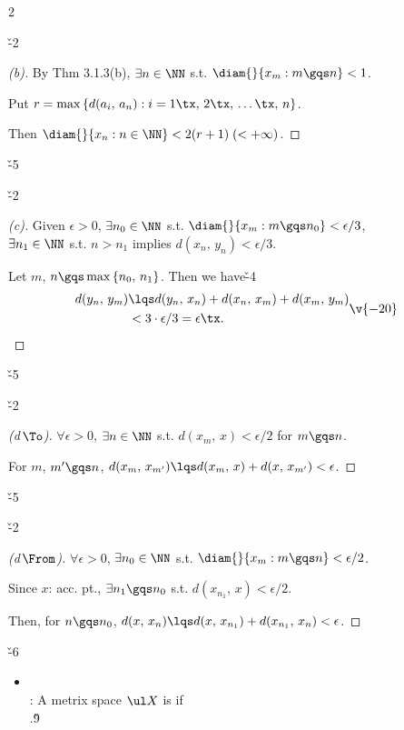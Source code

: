 \documentclass[dvipdfmx,a4paper,titlepage,9pt]{jsarticle}
\begin{document}
\begin{multicols*}{2}
\begin{pfbox}
\dotfill\v{-2}

\begin{proof}[\color{TGreen}(b)]
By Thm 3.1.3(b), $\exists n\in\NN$ s.t. $\diam{}\{x_m:m\gqs n\}<1$.

Put $r=\max{}\{d(a_i,\,a_n):i=1\tx,\,2\tx,\,\ldots\tx,\,n\}$.

Then $\diam{}\{x_n:n\in\NN\}<2(r+1)\;(<+\infty)$.
\end{proof}\v{-5}

\dotfill\v{-2}

\begin{proof}[\color{TGreen}(c)]
Given $\epsilon>0$, $\exists n_0\in\NN$ s.t. $\diam{}\{x_m:m\gqs n_0\}<\epsilon/3$,\\
$\exists n_1\in\NN$ s.t. $n>n_1$ implies $d(x_n,\,y_n)<\epsilon/3$.

Let $m$, $n\gqs\max{}\{n_0,\,n_1\}$. Then we have\v{-4}
$$\begin{aligned}
d(y_n,\,y_m)&\lqs d(y_n,\,x_n)+d(x_n,\,x_m)+d(x_m,\,y_m)\\
&<3\cdot\epsilon/3=\epsilon\tx.
\end{aligned}\v{-20}$$
\end{proof}\v{-5}

\dotfill\v{-2}

\begin{proof}[\color{TGreen}(d\,$\To$)]\rnc{\qedsymbol}{\Sq}$\forall\epsilon>0$, $\exists n\in\NN$ s.t. $d(x_m,\,x)<\epsilon/2$ for $m\gqs n$.

For $m$, $m'\gqs n$, $d(x_m,\,x_{m'})\lqs d(x_m,\,x)+d(x,\,x_{m'})<\epsilon$.
\end{proof}\v{-5}

\dotfill\v{-2}

\begin{proof}[\color{TGreen}(d\,$\From$)] $\forall\epsilon>0$, $\exists n_0\in\NN$ s.t. $\diam{}\{x_m:m\gqs n\}<\epsilon/2$.

Since $x$: acc. pt., $\exists n_1\gqs n_0$ s.t. $d(x_{n_1},\,x)<\epsilon/2$.

Then, for $n\gqs n_0$, $d(x,\,x_n)\lqs d(x,\,x_{n_1})+d(x_{n_1},\,x_n)<\epsilon$.
\end{proof}
\end{pfbox}

\vfill\null\columnbreak

\v{-6}
\begin{itemize}[label=-]
\item{}\\
: A metrix space $\ul X$ is  if\\
\;\;.\v9


\end{itemize}
\end{multicols*}
\end{document}
